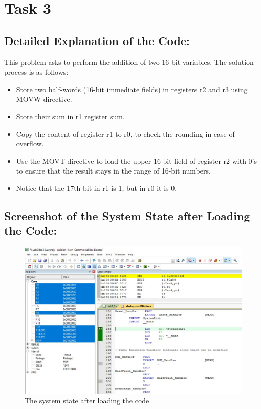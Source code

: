 \documentclass[12pt]{article}
\begin{document}
\pagebreak

\section{Task 3}

\subsection{Detailed Explanation of the Code:}
This problem asks to perform the addition of two 16-bit variables. The solution process is as follows: 
\begin{itemize}
    \item Store two half-words (16-bit immediate fields) in registers r2 and r3 using MOVW directive.
    \item Store their sum in r1 register sum.
    \item Copy the content of register r1 to r0, to check the rounding in case of overflow.
    \item Use the MOVT directive to load the upper 16-bit field of register r2 with 0's to ensure that the result stays in the range of 16-bit numbers.
    \item Notice that the 17th bit in r1 is 1, but in r0 it is 0.
\end{itemize}
\subsection{Screenshot of the System State after Loading the Code:}
\begin{figure}[ht]
    \centering
    \includegraphics[scale=.7]{images/lab2_ss5.jpg}
    \caption{The system state after loading the code}
    \label{fig:before_task_three}
\end{figure}
\end{document}
